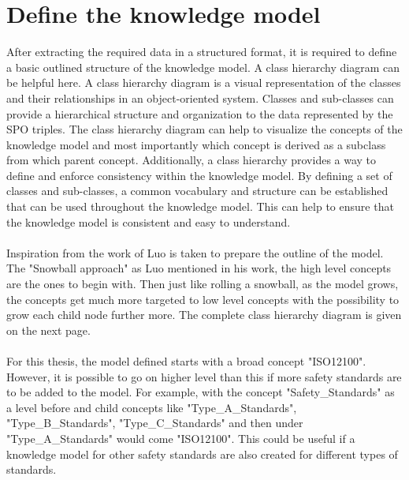 \section{Define the knowledge model}\label{class_hierarchy}

After extracting the required data in a structured format, it is required to define a basic outlined structure of the knowledge model. A class hierarchy diagram can be helpful here. A class hierarchy diagram is a visual representation of the classes and their relationships in an object-oriented system. Classes and sub-classes can provide a hierarchical structure and organization to the data represented by the SPO triples. The class hierarchy diagram can help to visualize the concepts of the knowledge model and most importantly which concept is derived as a subclass from which parent concept. Additionally, a class hierarchy provides a way to define and enforce consistency within the knowledge model. By defining a set of classes and sub-classes, a common vocabulary and structure can be established that can be used throughout the knowledge model. This can help to ensure that the knowledge model is consistent and easy to understand. 

\paragraph{} Inspiration from the work of Luo \cite{Luo2016} is taken to prepare the outline of the model. The "Snowball approach" as Luo mentioned in his work, the high level concepts are the ones to begin with. Then just like rolling a snowball, as the model grows, the concepts get much more targeted to low level concepts with the possibility to grow each child node further more. The complete class hierarchy diagram is given on the next page.


\paragraph{} For this thesis, the model defined starts with a broad concept "ISO12100". However, it is possible to go on higher level than this if more safety standards are to be added to the model. For example, with the concept "Safety\_Standards" as a level before and child concepts like "Type\_A\_Standards", "Type\_B\_Standards", "Type\_C\_Standards" and then under "Type\_A\_Standards" would come "ISO12100". This could be useful if a knowledge model for other safety standards are also created for different types of standards.

